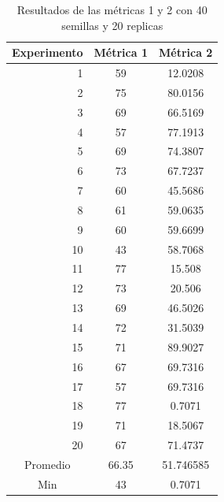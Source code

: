 \documentclass{article}
\begin{document}
\begin{center}
\begin{table}[htbp]
	\centering
	\caption{Resultados  de las métricas 1 y 2 con 40 semillas  y 20 replicas}
	\begin{tabular}{|c|c|c|}
		\hline
		Experimento  & \multicolumn{1}{l|}{Métrica 1} & \multicolumn{1}{p{5.39em}|}{Métrica 2} \\
		\hline
		\multicolumn{1}{|r|}{1} & 59    & 12.0208 \\
		\hline
		\multicolumn{1}{|r|}{2} & 75    & 80.0156 \\
		\hline
		\multicolumn{1}{|r|}{3} & 69    & 66.5169 \\
		\hline
		\multicolumn{1}{|r|}{4} & 57    & 77.1913 \\
		\hline
		\multicolumn{1}{|r|}{5} & 69    & 74.3807 \\
		\hline
		\multicolumn{1}{|r|}{6} & 73    & 67.7237 \\
		\hline
		\multicolumn{1}{|r|}{7} & 60    & 45.5686 \\
		\hline
		\multicolumn{1}{|r|}{8} & 61    & 59.0635 \\
		\hline
		\multicolumn{1}{|r|}{9} & 60    & 59.6699 \\
		\hline
		\multicolumn{1}{|r|}{10} & \cellcolor[rgb]{ .663,  .816,  .557}43 & 58.7068 \\
		\hline
		\multicolumn{1}{|r|}{11} & 77    & 15.508 \\
		\hline
		\multicolumn{1}{|r|}{12} & 73    & 20.506 \\
		\hline
		\multicolumn{1}{|r|}{13} & 69    & 46.5026 \\
		\hline
		\multicolumn{1}{|r|}{14} & 72    & 31.5039 \\
		\hline
		\multicolumn{1}{|r|}{15} & 71    & 89.9027 \\
		\hline
		\multicolumn{1}{|r|}{16} & 67    & 69.7316 \\
		\hline
		\multicolumn{1}{|r|}{17} & 57    & 69.7316 \\
		\hline
		\multicolumn{1}{|r|}{18} & 77    & \cellcolor[rgb]{ .663,  .816,  .557}0.7071 \\
		\hline
		\multicolumn{1}{|r|}{19} & 71    & 18.5067 \\
		\hline
		\multicolumn{1}{|r|}{20} & 67    & 71.4737 \\
		\hline
		Promedio & 66.35 & 51.746585 \\
		\hline
		Min   & 43    & 0.7071 \\
		\hline
	\end{tabular}%
	\label{tab:addlabel}%
\end{table}%

\end{center}
\newpage
\end{document}
